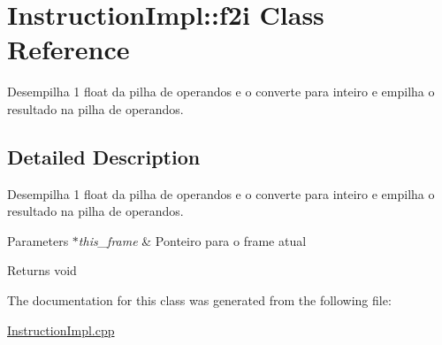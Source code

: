 \hypertarget{class_instruction_impl_1_1f2i}{}\section{Instruction\+Impl\+:\+:f2i Class Reference}
\label{class_instruction_impl_1_1f2i}


Desempilha 1 float da pilha de operandos e o converte para inteiro e empilha o resultado na pilha de operandos.  




\subsection{Detailed Description}
Desempilha 1 float da pilha de operandos e o converte para inteiro e empilha o resultado na pilha de operandos. 


\begin{DoxyParams}{Parameters}
{\em $\ast$this\+\_\+frame} & Ponteiro para o frame atual \\
\hline
\end{DoxyParams}
\begin{DoxyReturn}{Returns}
void 
\end{DoxyReturn}


The documentation for this class was generated from the following file\+:\begin{DoxyCompactItemize}
\item 
\hyperlink{_instruction_impl_8cpp}{Instruction\+Impl.\+cpp}\end{DoxyCompactItemize}

